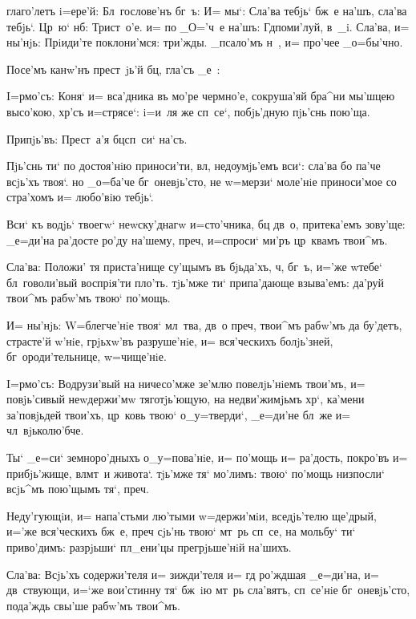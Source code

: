 
глаго'летъ i=ере'й: Бл~гослове'нъ бг~ъ: И= мы`: Сла'ва 
тебjь` бж~е на'шъ, сла'ва тебjь`. Цр~ю` нб: 
Трист~о'е. и= по _О='ч~е на'шъ: Гд поми'луй, в~_i. 
Сла'ва, и= ны'нjь: Прiиди'те поклони'мся: три'жды. 
_псало'мъ н~, и= про'чее _о=бы'чно.

Посе'мъ канw'нъ прест~jь'й бц, гла'съ _е~:


I=рмо'съ: Коня` и= вса'дника въ мо'ре чермно'е, 
сокруша'яй бра^ни мы'шцею высо'кою, хр'съ и=стрясе`: 
i=и~ля же сп~се`, побjь'дную пjь'снь пою'ща. 

Припjь'въ: Прест~а'я бц сп~си` на'съ.

Пjь'снь ти` по достоя'нiю приноси'ти, вл, 
недоумjь'емъ вси`: сла'ва бо па'че всjь'хъ твоя`. но 
_о=ба'че бг~оневjь'сто, не w=мерзи` моле'нiе приноси'мое 
со стра'хомъ и= любо'вiю тебjь`.

Вси` къ водjь` твоегw` неwску'днагw и=сто'чника, бц 
дв~о, притека'емъ зову'ще: _е=ди'на ра'досте ро'ду 
на'шему, преч, и=спроси` ми'ръ цр~квамъ твои^мъ.

Сла'ва: Положи' тя приста'нище су'щымъ въ бjьда'хъ, 
ч, бг~ъ, и='же w\т тебе` бл~говоли'вый воспрiя'ти 
пло'ть. тjь'мже ти` припа'дающе взыва'емъ: да'руй твои^мъ 
рабw'мъ твою` по'мощь.

И= ны'нjь: W=блегче'нiе твоя` мл~тва, дв~о преч, 
твои^мъ рабw'мъ да бу'детъ, страсте'й w'нiе, 
грjьхw'въ разруше'нiе, и= вся'ческихъ болjь'зней, 
бг~ороди'тельнице, w=чище'нiе.


I=рмо'съ: Водрузи'вый на ничесо'мже зе'млю 
повелjь'нiемъ твои'мъ, и= повjь'сивый неwдержи'мw 
тяготjь'ющую, на недви'жимjьмъ хр`, ка'мени 
за'повjьдей твои'хъ, цр~ковь твою` о_у=тверди`, _е=ди'не 
бл~же и= чл~вjьколю'бче.

Ты` _е=си` земноро'дныхъ о_у=пова'нiе, и= по'мощь и= 
ра'дость, покро'въ и= прибjь'жище, вл мт~и живота`. 
тjь'мже тя` мо'лимъ: твою` по'мощь низпосли` всjь^мъ 
пою'щымъ тя`, преч.

Неду'гующiи, и= напа'стьми лю'тыми w=держи'мiи, 
вседjь'телю ще'дрый, и='же вся'ческихъ бж~е, преч 
сjь'нь твою` мт~рь сп~се, на мольбу` ти` приво'димъ: 
разрjьши` пл_ени'цы прегрjьше'нiй на'шихъ.

Сла'ва: Всjь'хъ содержи'теля и= зижди'теля и= гд 
ро'ждшая _е=ди'на, и= дв~ствующи, и=`же вои'стинну тя` 
бж~iю мт~рь сла'вятъ, сп~се'нiе бг~оневjь'сто, пода'ждь 
свы'ше рабw'мъ твои^мъ.

